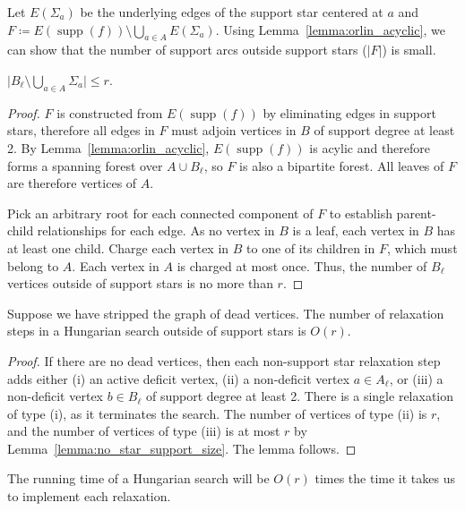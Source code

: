 \documentclass[a4paper,UKenglish]{socg-lipics-v2018}
\def\abs#1{\mathopen| #1 \mathclose|}		%
\def\supp{\operatorname{supp}}
\theoremstyle{plain}
\numberwithin{figure}{section}
\def\EMPH#1{\textbf{\emph{\boldmath #1}}}
\begin{document}
Let \EMPH{$E(\Sigma_a)$} be the underlying edges of the support star centered
at $a$ and $F \coloneqq E(\supp(f)) \setminus \bigcup_{a \in A} E(\Sigma_a)$.
Using Lemma~\ref{lemma:orlin_acyclic}, we can show that the number of support
arcs outside support stars ($\abs{F}$) is small.

\begin{lemmarep}
\label{lemma:no_star_support_size}
$\abs{B_\ell \setminus \bigcup_{a \in A} \Sigma_a} \leq r$.
\end{lemmarep}

\begin{proof}
$F$ is constructed from $E(\supp(f))$ by eliminating edges in support stars,
therefore all edges in $F$ must adjoin vertices in $B$ of support degree at
least 2.
By Lemma~\ref{lemma:orlin_acyclic}, $E(\supp(f))$ is acylic and therefore forms
a spanning forest over $A \cup B_\ell$, so $F$ is also a bipartite forest.
All leaves of $F$ are therefore vertices of $A$.

Pick an arbitrary root for each connected component of $F$ to establish
parent-child relationships for each edge.
As no vertex in $B$ is a leaf, each vertex in $B$ has at least one child.
Charge each vertex in $B$ to one of its children in $F$, which must belong to $A$.
Each vertex in $A$ is charged at most once.
Thus, the number of $B_\ell$ vertices outside of support stars is no more than $r$.
\end{proof}

\begin{lemmarep}
\label{lemma:orlin_relax_count}
Suppose we have stripped the graph of dead vertices.
The number of relaxation steps in a Hungarian search outside of support stars
is $O(r)$.
\end{lemmarep}

\begin{proof}
If there are no dead vertices, then each non-support star relaxation step adds
either
(i) an active deficit vertex,
(ii) a non-deficit vertex $a \in A_\ell$, or
(iii) a non-deficit vertex $b \in B_\ell$ of support degree at least 2.
There is a single relaxation of type (i), as it terminates the search.
The number of vertices of type (ii) is $r$, and the number of vertices of type
(iii) is at most $r$ by Lemma~\ref{lemma:no_star_support_size}.
The lemma follows.
\end{proof}

The running time of a Hungarian search will be $O(r)$ times the time it takes
us to implement each relaxation.
\end{document}
